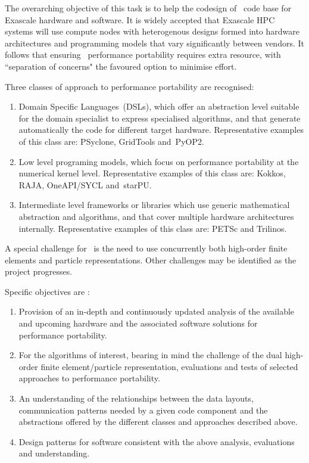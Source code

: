 The overarching objective of this task is to help the codesign of \nep \ code
base for Exascale hardware and software. It is widely accepted that 
Exascale HPC systems will use compute nodes with heterogenous 
designs formed into hardware architectures and programming models that vary significantly 
between vendors. It follows that ensuring \nep \ 
performance portability requires extra resource, with ``separation of 
concerns" the favoured option to minimise effort.

Three classes of approach to performance portability are recognised:  
\begin{enumerate}
\item Domain Specific Languages~(DSLs), which offer an abstraction level suitable for 
the domain specialist to express specialised algorithms, and that generate automatically 
the code for different target hardware. Representative examples of this class are: PSyclone, GridTools and~PyOP2.
\item Low level programing models, which focus on performance portability at the numerical 
kernel level. Representative examples of this class are: Kokkos, RAJA, OneAPI/SYCL and~starPU.
\item Intermediate level frameworks or libraries 
which use generic mathematical abstraction and algorithms, and that cover multiple 
hardware architectures internally. Representative examples of this class are: PETSc and Trilinos.
\end{enumerate}

A special challenge for \nep \ is the need to use concurrently both high-order finite elements
and particle representations. Other challenges may be identified as the project progresses.


Specific objectives are : 
\begin{enumerate}
\item Provision of an in-depth and continuously updated analysis of the available and upcoming 
hardware and the associated software solutions for performance portability.

\item For the algorithms of interest, bearing in mind
the challenge of the dual high-order finite element/particle representation,
evaluations and tests of selected approaches to performance portability.

\item An understanding of the relationships between the data layouts, 
communication patterns needed by a given code component and the abstractions offered 
by the different classes and approaches described above.

\item Design patterns for software consistent with the above analysis, evaluations and understanding.
\end{enumerate}

